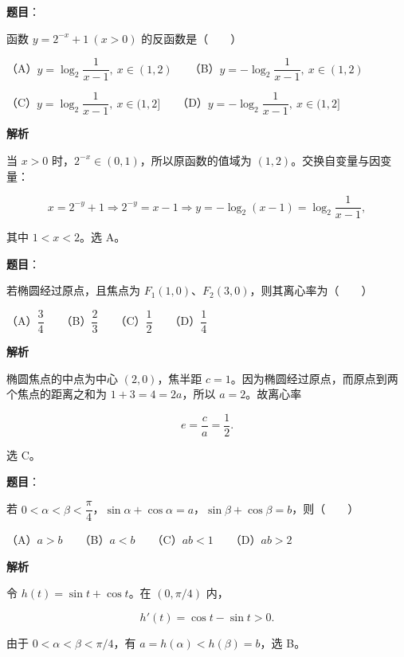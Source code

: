\begin{answer}

\textbf{题目}：

函数 $y=2^{-x}+1\ (x>0)$ 的反函数是\mbox{（　　）}

（A）$y=\log_2\dfrac1{x-1},\ x\in(1,2)$　　（B）$y=-\log_2\dfrac1{x-1},\ x\in(1,2)$

（C）$y=\log_2\dfrac1{x-1},\ x\in(1,2]$　　（D）$y=-\log_2\dfrac1{x-1},\ x\in(1,2]$

\textbf{解析}

当 $x>0$ 时，$2^{-x}\in(0,1)$，所以原函数的值域为 $(1,2)$。交换自变量与因变量：

\nopagebreak[4]
\[
x=2^{-y}+1
\Longrightarrow 2^{-y}=x-1
\Longrightarrow y=-\log_2(x-1)=\log_2\frac1{x-1},
\]

其中 $1<x<2$。选 A。


\end{answer}
\begin{answer}

\textbf{题目}：

若椭圆经过原点，且焦点为 $F_1(1,0)$、$F_2(3,0)$，则其离心率为\mbox{（　　）}

（A）$\dfrac34$　　（B）$\dfrac23$　　（C）$\dfrac12$　　（D）$\dfrac14$

\textbf{解析}

椭圆焦点的中点为中心 $(2,0)$，焦半距 $c=1$。因为椭圆经过原点，而原点到两个焦点的距离之和为 $1+3=4=2a$，所以 $a=2$。故离心率

\nopagebreak[4]
\[
e=\frac ca=\frac12.
\]

选 C。


\end{answer}
\begin{answer}

\textbf{题目}：

若 $0<\alpha<\beta<\dfrac\pi4$，$\sin\alpha+\cos\alpha=a$，$\sin\beta+\cos\beta=b$，则\mbox{（　　）}

（A）$a>b$　　（B）$a<b$　　（C）$ab<1$　　（D）$ab>2$

\textbf{解析}

令 $h(t)=\sin t+\cos t$。在 $(0,\pi/4)$ 内，

\nopagebreak[4]
\[
h'(t)=\cos t-\sin t>0.
\]

由于 $0<\alpha<\beta<\pi/4$，有 $a=h(\alpha)<h(\beta)=b$，选 B。


\end{answer}
